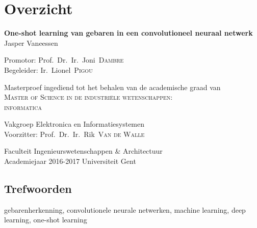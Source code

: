 
\newpage
{}
{
\setlength{\baselineskip}{12pt}
\setlength{\parindent}{0pt}
\setlength{\parskip}{6pt}

\chapter{Overzicht}
\begin{center}

\vspace{5mm}
\renewcommand{\baselinestretch}{1.1}
\noindent \textbf{
One-shot learning van gebaren in een convolutioneel neuraal netwerk
} \\
\renewcommand{\baselinestretch}{1.3}
\normalsize
Jasper Vaneessen
\vspace{5mm}
\end{center}

Promotor: Prof.~Dr.~Ir.~Joni~\textsc{Dambre}\\
Begeleider: Ir.~Lionel~\textsc{Pigou}

\vspace{5mm}

Masterproef ingediend tot het behalen van de academische graad van\\
\textsc{Master of Science in de industri\"ele wetenschappen:\\ informatica}

\vspace{5mm}

Vakgroep Elektronica en Informatiesystemen\\
Voorzitter: Prof.~Dr.~Ir.~Rik~\textsc{Van de Walle}

\vspace{5mm}

Faculteit Ingenieurswetenschappen \& Architectuur\\
Academiejaar 2016-2017
Universiteit Gent





\section*{Trefwoorden}
gebarenherkenning, convolutionele neurale netwerken, machine learning, deep learning, one-shot learning
}

\newpage %
